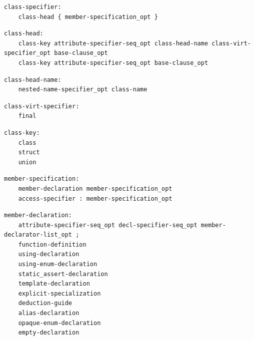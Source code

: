 \noindent\textbf{\texttt{}}\par
\begin{lstlisting}
class-specifier:
    class-head { member-specification_opt }
\end{lstlisting}

\noindent\textbf{\texttt{}}\par
\begin{lstlisting}
class-head:
    class-key attribute-specifier-seq_opt class-head-name class-virt-specifier_opt base-clause_opt
    class-key attribute-specifier-seq_opt base-clause_opt
\end{lstlisting}

\noindent\textbf{\texttt{}}\par
\begin{lstlisting}
class-head-name:
    nested-name-specifier_opt class-name
\end{lstlisting}

\noindent\textbf{\texttt{}}\par
\begin{lstlisting}
class-virt-specifier:
    final
\end{lstlisting}

\noindent\textbf{\texttt{}}\par
\begin{lstlisting}
class-key:
    class
    struct
    union
\end{lstlisting}

\noindent\textbf{\texttt{}}\par
\begin{lstlisting}
member-specification:
    member-declaration member-specification_opt
    access-specifier : member-specification_opt
\end{lstlisting}

\noindent\textbf{\texttt{}}\par
\begin{lstlisting}
member-declaration:
    attribute-specifier-seq_opt decl-specifier-seq_opt member-declarator-list_opt ;
    function-definition
    using-declaration
    using-enum-declaration
    static_assert-declaration
    template-declaration
    explicit-specialization
    deduction-guide
    alias-declaration
    opaque-enum-declaration
    empty-declaration
\end{lstlisting}

